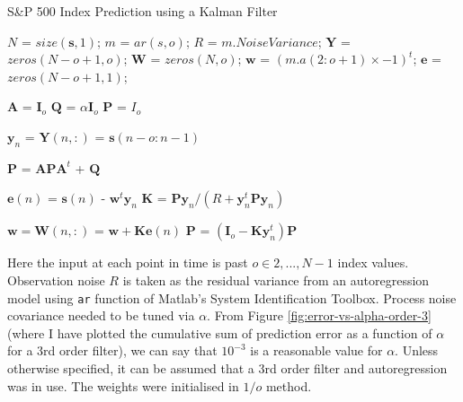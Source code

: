 \documentclass[11pt, fleqn]{article}
\begin{document}
\begin{algorithm}[H]
\caption{S\&P 500 Index Prediction using a Kalman Filter}
\label{alg:kalman}
\begin{algorithmic}

 

\State

\State $N$ = $size(\bm{s}, 1)$; 
\State $m$ = $ar(s, o)$; 
\State $R$ = $m.NoiseVariance$; 
\State $\bm{Y}$ = $zeros(N - o + 1, o)$; 
\State $\bm{W}$ = $zeros(N, o)$; 
\State $\bm{w}$ = $(m.a(2:o+1) \times -1)^t$; 
\State $\bm{e}$ = $zeros(N - o + 1, 1)$; 

\State

\State $\bm{A}$ = $\bm{I}_o$ 
\State $\bm{Q}$ = $\alpha\bm{I}_o$ 
\State $\bm{P}$ = $I_o$ 

\State


	\State $\bm{y}_n$ = $\bm{Y}(n, :)$ = $\bm{s}(n - o:n - 1)$ 

	\State

	\State $\bm{P}$ = $\bm{A}\bm{P}\bm{A}^t$ + $\bm{Q}$ 

	\State
	
	\State $\bm{e}(n)$ = $\bm{s}(n)$ - $\bm{w}^t\bm{y}_n$ 
	\State $\bm{K}$ = $\bm{P}\bm{y}_n/(R + \bm{y}_n^t\bm{P}\bm{y}_n)$ 

	\State

	\State $\bm{w} = \bm{W}(n, :)$ = $\bm{w} + \bm{K}\bm{e}(n)$ 
	\State $\bm{P}$ = $(\bm{I}_o - \bm{K}\bm{y}_n^t)\bm{P}$ 

\EndFor

\EndProcedure
\end{algorithmic}
\end{algorithm}

Here the input at each point in time is past $o \in {2, ..., N-1}$ index values. Observation noise $R$ is taken as the residual variance from an autoregression model using \texttt{ar} function of Matlab's System Identification Toolbox. Process noise covariance needed to be tuned via $\alpha$. From Figure \ref{fig:error-vs-alpha-order-3} (where I have plotted the cumulative sum of prediction error as a function of $\alpha$ for a 3rd order filter), we can say that $10^{-3}$ is a reasonable value for $\alpha$. Unless otherwise specified, it can be assumed that a 3rd order filter and autoregression was in use. The weights were initialised in $1/o$ method.\\
\end{document}
